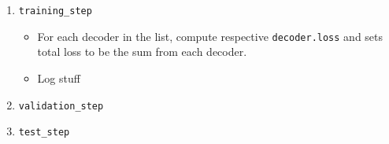 \begin{itemize}
\begin{enumerate}
\begin{enumerate}
\begin{enumerate}
                            


                            \item \texttt{training\_step}
                                \begin{itemize}
                                    \item For each decoder in the list, compute respective \texttt{decoder.loss} and sets total loss to be the sum from each decoder.
                                    \item Log stuff
                                \end{itemize}

                            \item \texttt{validation\_step}

                            \item \texttt{test\_step}

                        \end{enumerate}

                \end{enumerate}
        \end{enumerate}
\end{itemize}
